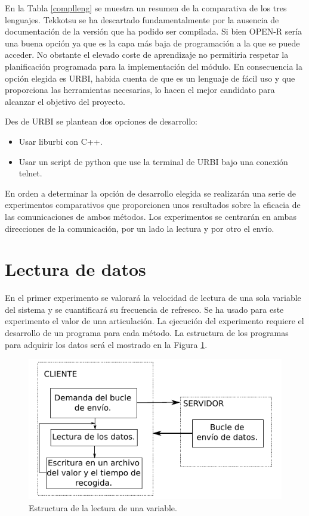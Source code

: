 \documentclass[12pt,a4paper,final,twoside]{book}
\begin{document}
En la Tabla \ref{complleng} se muestra un resumen de la comparativa de los tres lenguajes. Tekkotsu se ha descartado fundamentalmente por la ausencia de documentación de la versión que ha podido ser compilada. Si bien OPEN-R sería una buena opción ya que es la capa más baja de programación a la que se puede acceder. No obstante el elevado coste de aprendizaje no permitiria respetar la planificación programada para la implementación del módulo. En consecuencia la opción elegida es URBI, habida cuenta de que es un lenguaje de fácil uso y que proporciona las herramientas necesarias, lo hacen el mejor candidato para alcanzar el objetivo del proyecto.


Des de URBI se plantean dos opciones de desarrollo:
\begin{itemize}
\item Usar liburbi con C++.
\item Usar un script de python que use la terminal de URBI bajo una conexión telnet.
\end{itemize}

En orden a determinar la opción de desarrollo elegida se realizarán una serie de experimentos comparativos que proporcionen unos resultados sobre la eficacia de las comunicaciones de ambos métodos.
Los experimentos se centrarán en ambas direcciones de la comunicación, por un lado la lectura y por otro el envío. 

\section{Lectura de datos}\label{compenvio}
En el primer experimento se valorará la velocidad de lectura de una sola variable del sistema y se cuantificará su frecuencia de refresco. Se ha usado para este experimento el valor de una articulación. La ejecución del experimento requiere el desarrollo de un programa para cada método. La estructura de los programas para adquirir los datos será el mostrado en la Figura \ref{fig:readleg}.


\begin{figure}[h!]
	\centering
    \includegraphics[scale=1.4]{images/lectdata.pdf}
	 \caption{Estructura de la lectura de una variable.}
  \label{fig:readleg}
\end{figure}
\end{document}
